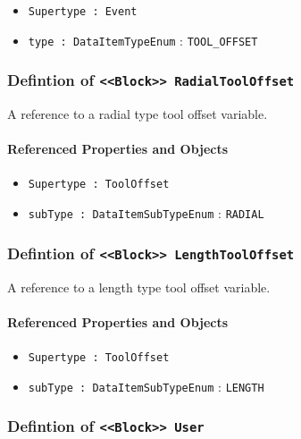 \begin{itemize}
\item \texttt{Supertype : Event}

\item \texttt{type : DataItemTypeEnum} : \texttt{TOOL_OFFSET}

\end{itemize}
\FloatBarrier
\subsubsection{Defintion of \texttt{<<Block>> RadialToolOffset}}
  \label{type:RadialToolOffset}

\FloatBarrier

A reference to a radial type tool offset variable.

\FloatBarrier
\paragraph{Referenced Properties and Objects}

\begin{itemize}
\item \texttt{Supertype : ToolOffset}

\item \texttt{subType : DataItemSubTypeEnum} : \texttt{RADIAL}

\end{itemize}
\FloatBarrier
\subsubsection{Defintion of \texttt{<<Block>> LengthToolOffset}}
  \label{type:LengthToolOffset}

\FloatBarrier

A reference to a length type tool offset variable.

\FloatBarrier
\paragraph{Referenced Properties and Objects}

\begin{itemize}
\item \texttt{Supertype : ToolOffset}

\item \texttt{subType : DataItemSubTypeEnum} : \texttt{LENGTH}

\end{itemize}
\FloatBarrier
\subsubsection{Defintion of \texttt{<<Block>> User}}
  \label{type:User}

